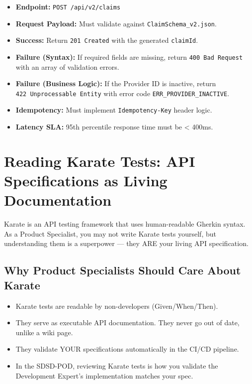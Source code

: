 \begin{itemize}
\tightlist
\item
  \textbf{Endpoint:} \texttt{POST\ /api/v2/claims}
\item
  \textbf{Request Payload:} Must validate against
  \texttt{ClaimSchema\_v2.json}.
\item
  \textbf{Success:} Return \texttt{201\ Created} with the generated
  \texttt{claimId}.
\item
  \textbf{Failure (Syntax):} If required fields are missing, return
  \texttt{400\ Bad\ Request} with an array of validation errors.
\item
  \textbf{Failure (Business Logic):} If the Provider ID is inactive,
  return \texttt{422\ Unprocessable\ Entity} with error code
  \texttt{ERR\_PROVIDER\_INACTIVE}.
\item
  \textbf{Idempotency:} Must implement \texttt{Idempotency-Key} header
  logic.
\item
  \textbf{Latency SLA:} 95th percentile response time must be
  \textless{} 400ms.
\end{itemize}

\section{Reading Karate Tests: API Specifications as Living
Documentation}\label{reading-karate-tests-api-specifications-as-living-documentation}

Karate is an API testing framework that uses human-readable Gherkin
syntax. As a Product Specialist, you may not write Karate tests
yourself, but understanding them is a superpower --- they ARE your
living API specification.

\subsection{Why Product Specialists Should Care About
Karate}\label{why-product-specialists-should-care-about-karate}

\begin{itemize}
\tightlist
\item
  Karate tests are readable by non-developers (Given/When/Then).
\item
  They serve as executable API documentation. They never go out of date,
  unlike a wiki page.
\item
  They validate YOUR specifications automatically in the CI/CD pipeline.
\item
  In the SDSD-POD, reviewing Karate tests is how you validate the
  Development Expert's implementation matches your spec.
\end{itemize}

